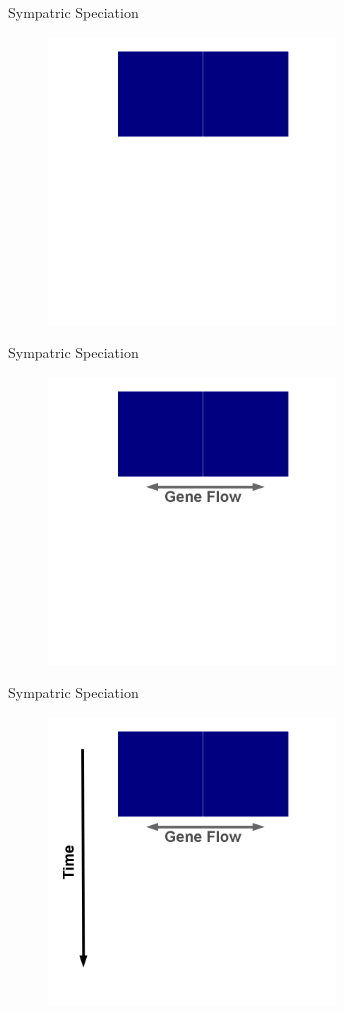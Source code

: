 \documentclass[t,10pt]{beamer}
\begin{document}
\begin{frame}[label={sec:orgheadline11}]{Sympatric Speciation}
\begin{figure}[htb]
\centering
\includegraphics[width=3in,height=3in]{./Figures/Sympatric_Speciation_Figure/png/1_Sympatric_Speciation.png}
\end{figure}
\end{frame}
\begin{frame}[label={sec:orgheadline12}]{Sympatric Speciation}
\begin{figure}[htb]
\centering
\includegraphics[width=3in,height=3in]{./Figures/Sympatric_Speciation_Figure/png/2_Sympatric_Speciation.png}
\end{figure}
\end{frame}
\begin{frame}[label={sec:orgheadline13}]{Sympatric Speciation}
\begin{figure}[htb]
\centering
\includegraphics[width=3in,height=3in]{./Figures/Sympatric_Speciation_Figure/png/3_Sympatric_Speciation.png}
\end{figure}
\end{frame}
\end{document}
